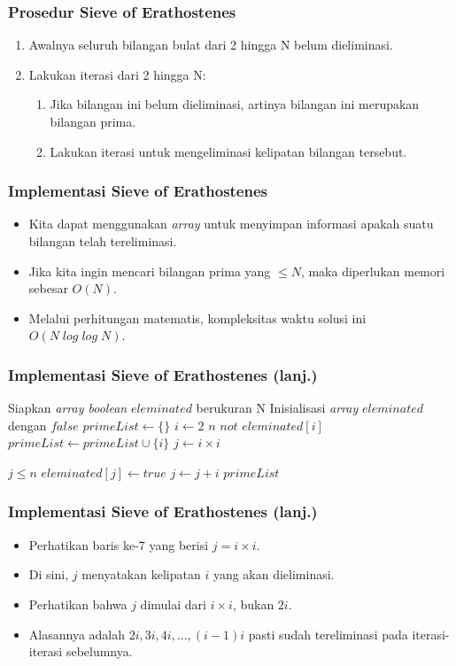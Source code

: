 \begin{frame}
\frametitle{Prosedur Sieve of Erathostenes}
\begin{enumerate}
  \item Awalnya seluruh bilangan bulat dari 2 hingga N belum dieliminasi.
  \item Lakukan iterasi dari 2 hingga N:
  \begin{enumerate}
    \item Jika bilangan ini belum dieliminasi, artinya bilangan ini merupakan bilangan prima.
    \item Lakukan iterasi untuk mengeliminasi kelipatan bilangan tersebut.  
  \end{enumerate}
\end{enumerate}
\end{frame}

\begin{frame}
\frametitle{Implementasi Sieve of Erathostenes}
\begin{itemize}
  \item Kita dapat menggunakan \textit{array}  untuk menyimpan informasi apakah suatu bilangan telah tereliminasi.
  \item Jika kita ingin mencari bilangan prima yang $\leq N$, maka diperlukan memori sebesar $O(N)$.
  \item Melalui perhitungan matematis, kompleksitas waktu solusi ini $O(N\;log\;log\;N)$.
\end{itemize}
\end{frame}

\begin{frame}[fragile]
\frametitle{Implementasi Sieve of Erathostenes (lanj.)}
\begin{codebox}
\li \Comment Siapkan \textit{array boolean} $eleminated$ berukuran N
\li \Comment Inisialisasi \textit{array} $eleminated$ dengan $false$
\li $primeList \gets \{\}$
\li \For $i \gets 2$ \To $n$
    \Do
\li   \If $not$ $eleminated[i]$
      \Then
\li     $primeList \gets primeList \cup \{i\}$
\li     $j \gets i \times i$ 

\li     \While $j \leq n$
        \Do
\li       $eleminated[j] \gets true$
\li       $j \gets j + i$       
        \End
      \End      
    \End
\li \Return $primeList$
\end{codebox}
\end{frame}

\begin{frame}
\frametitle{Implementasi Sieve of Erathostenes (lanj.)}
\begin{itemize}
  \item Perhatikan baris ke-7 yang berisi $j = i \times i$.
  \item Di sini, $j$ menyatakan kelipatan $i$ yang akan dieliminasi.
  \item Perhatikan bahwa $j$ dimulai dari $i \times i$, bukan $2i$.
  \item Alasannya adalah $2i, 3i, 4i, ..., (i-1)i$ pasti sudah tereliminasi pada iterasi-iterasi sebelumnya.
\end{itemize}
\end{frame}

